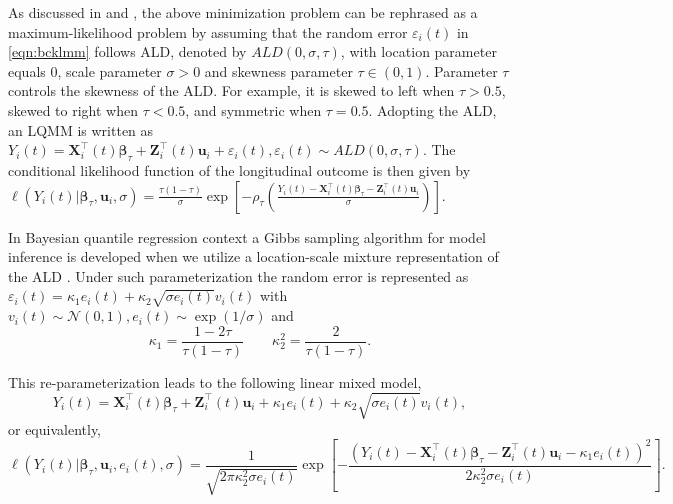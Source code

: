 As discussed in \citet{koenker1999goodness} and \citet{yu2001bayesian}, the above minimization problem can be rephrased as a maximum-likelihood problem by assuming that the random error $\varepsilon_{i}(t)$ in \eqref{eqn:bcklmm} follows ALD, denoted by $ALD(0, \sigma, \tau)$, with location parameter equals 0, scale parameter $\sigma>0$ and skewness parameter $\tau\in (0, 1)$. Parameter $\tau$ controls the skewness of the ALD. For example, it is skewed to left when $\tau>0.5$, skewed to right when $\tau<0.5$, and symmetric when $\tau=0.5$. Adopting the ALD, an LQMM is written as $Y_{i}(t) ={\boldsymbol X}_{i}^{\top}(t) \boldsymbol{\beta}_{\tau}+ {\boldsymbol Z}_{i}^{\top}(t)\boldsymbol{u}_i + \varepsilon_{i}(t), \varepsilon_{i}(t)\sim ALD(0, \sigma, \tau)$. The conditional likelihood function of the longitudinal outcome is then given by $\ell(Y_{i}(t)|\boldsymbol{\beta}_{\tau},\boldsymbol{u}_i,\sigma)=\frac{\tau(1-\tau)}{\sigma}\exp\left[-\rho_{\tau}\left(\frac{Y_{i}(t)-{\boldsymbol X}_{i}^{\top}(t)\boldsymbol{\beta}_{\tau}-{\boldsymbol Z}_{i}^{\top}(t)\boldsymbol{u}_i}{\sigma}\right)\right]$.

In Bayesian quantile regression context a Gibbs sampling algorithm for model inference is developed when we utilize a location-scale mixture representation of the ALD \citep{kotz2001laplace}. Under such parameterization the random error is represented as $\varepsilon_{i}(t)=\kappa_1e_{i}(t)+\kappa_2\sqrt{\sigma e_{i}(t)}v_{i}(t)$ with $v_{i}(t)\sim \mathcal{N}(0,1), e_{i}(t)\sim\exp(1/\sigma)$ and
\[\kappa_1=\frac{1-2\tau}{\tau(1-\tau)}\hspace{2em} \kappa_2^2=\frac{2}{\tau(1-\tau)}.\]


This re-parameterization leads to the following linear mixed model,
\begin{equation*}\label{eqn:bak_reformald2}
Y_{i}(t)={\boldsymbol X}_{i}^{\top}(t)\boldsymbol{\beta}_{\tau}+{\boldsymbol Z}_{i}^{\top}(t)\boldsymbol{u}_i+\kappa_1e_{i}(t)+\kappa_2\sqrt{\sigma e_{i}(t)}v_{i}(t),
\end{equation*}
\noindent or equivalently,
{\small
\begin{equation}\label{eqn:bak_lqmm_repar}
\ell(Y_{i}(t)|\boldsymbol{\beta}_{\tau},\boldsymbol{u}_i,e_{i}(t),\sigma)=\frac{1}{\sqrt{2\pi\kappa_2^2\sigma e_{i}(t)}}\exp\left[-\frac{(Y_{i}(t)-{\boldsymbol X}_{i}^{\top}(t)\boldsymbol{\beta}_{\tau}-{\boldsymbol Z}_{i}^{\top}(t)\boldsymbol{u}_i-\kappa_1e_{i}(t))^2}{2\kappa_2^2\sigma e_{i}(t)}\right].
\end{equation}
}


